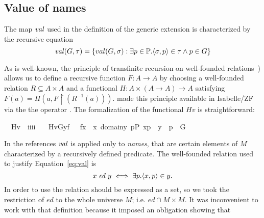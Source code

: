 \subsection*{Value of names}

The map $\operatorname{\mathit{val}}$ used in the definition of the generic extension is
characterized by the recursive equation
\begin{equation}
  \label{eq:val}
  \val(G,\tau) = \{val(G,\sigma) :\exists p \in\PP .%
  \lb\sigma,p\rb \in \tau \wedge p \in G \}
\end{equation}

As is well-known, the principle of transfinite recursion on
well-founded relations~\cite[p. 48]{kunen2011set}) allows us to define
a recursive function $F \colon A\to A$ by choosing a well-founded
relation $R \subseteq A\times A$ and a functional
$H\colon A\times (A \to A) \to A$ satisfying
$F(a)=H(a,F\!\upharpoonright\!(R^{-1}(a)))$. \citet{paulson1995set}
made this principle available in Isabelle/ZF via the the operator
. The formalization of the functional $\mathit{Hv}$ is
straightforward:
%
\begin{isabelle}
\isamarkupfalse%
\isanewline
\ \ Hv\ {\isacharcolon}{\isacharcolon}\ {\isachardoublequoteopen}i{\isasymRightarrow}i{\isasymRightarrow}i{\isasymRightarrow}i{\isachardoublequoteclose}\ \isanewline
\ \ {\isachardoublequoteopen}Hv{\isacharparenleft}G{\isacharcomma}y{\isacharcomma}f{\isacharparenright}\ {\isacharequal}{\isacharequal}\ {\isacharbraceleft}\ f{\isacharbackquote}x\ {\isachardot}{\isachardot}\ x{\isasymin}\ domain{\isacharparenleft}y{\isacharparenright}{\isacharcomma}\ {\isasymexists}p{\isasymin}P{\isachardot}\ {\isacharless}x{\isacharcomma}p{\isachargreater}\ {\isasymin}\ y\ {\isasymand}\ p\ {\isasymin}\ G\ {\isacharbraceright}{\isachardoublequoteclose}
\end{isabelle}
In the references \cite{kunen2011set,weaver2014forcing} $\operatorname{\mathit{val}}$ is
applied only to \emph{names}, that are certain elements of $M$
characterized by a recursively defined predicate. The well-founded
relation used to justify Equation~\eqref{eq:val} is
\[ x \mathrel{\mathit{ed}} y \iff \exists p . \langle x,p\rangle\in y. \] In
order to use  the relation should be expressed as a set, so
we took the restriction of $\mathit{ed}$ to the whole universe
$M$; i.e. $\mathit{ed}\cap M\times M$.  It was inconvenient to work
with that definition because it imposed an obligation showing that
